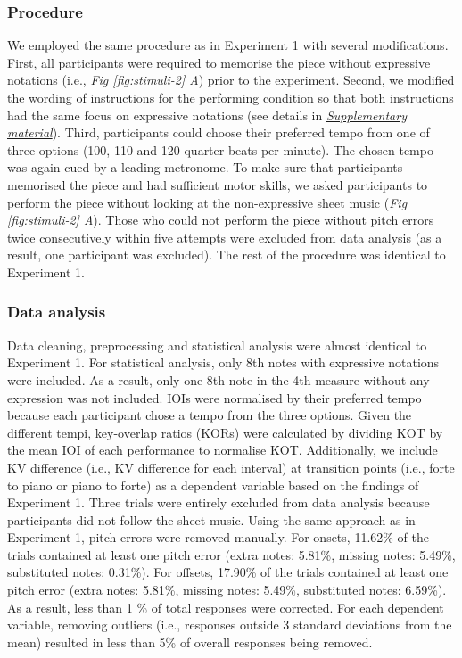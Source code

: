 \documentclass[
  man,floatsintext]{apa6}
\begin{document}
\hypertarget{procedure-2}{%
\subsubsection{Procedure}\label{procedure-2}}

We employed the same procedure as in Experiment 1 with several modifications. First, all participants were required to memorise the piece without expressive notations (i.e., \emph{Fig \ref{fig:stimuli-2} A}) prior to the experiment. Second, we modified the wording of instructions for the performing condition so that both instructions had the same focus on expressive notations (see details in \emph{\protect\hyperlink{supplementary}{Supplementary material}}). Third, participants could choose their preferred tempo from one of three options (100, 110 and 120 quarter beats per minute). The chosen tempo was again cued by a leading metronome. To make sure that participants memorised the piece and had sufficient motor skills, we asked participants to perform the piece without looking at the non-expressive sheet music (\emph{Fig \ref{fig:stimuli-2} A}). Those who could not perform the piece without pitch errors twice consecutively within five attempts were excluded from data analysis (as a result, one participant was excluded). The rest of the procedure was identical to Experiment 1.

\hypertarget{data-analysis-1}{%
\subsubsection{Data analysis}\label{data-analysis-1}}

Data cleaning, preprocessing and statistical analysis were almost identical to Experiment 1. For statistical analysis, only 8th notes with expressive notations were included. As a result, only one 8th note in the 4th measure without any expression was not included. IOIs were normalised by their preferred tempo because each participant chose a tempo from the three options. Given the different tempi, key-overlap ratios (KORs) were calculated by dividing KOT by the mean IOI of each performance to normalise KOT. Additionally, we include KV difference (i.e., KV difference for each interval) at transition points (i.e., forte to piano or piano to forte) as a dependent variable based on the findings of Experiment 1. Three trials were entirely excluded from data analysis because participants did not follow the sheet music. Using the same approach as in Experiment 1, pitch errors were removed manually. For onsets, 11.62\% of the trials contained at least one pitch error (extra notes: 5.81\%, missing notes: 5.49\%, substituted notes: 0.31\%). For offsets, 17.90\% of the trials contained at least one pitch error (extra notes: 5.81\%, missing notes: 5.49\%, substituted notes: 6.59\%). As a result, less than 1 \% of total responses were corrected. For each dependent variable, removing outliers (i.e., responses outside 3 standard deviations from the mean) resulted in less than 5\% of overall responses being removed.
\end{document}
